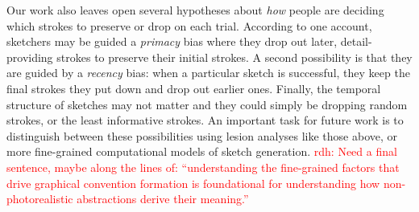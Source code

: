 \documentclass[10pt,letterpaper]{article}
\newcommand{\rdh}[1]{\textcolor{Red}{rdh: #1}}
\begin{document}
Our work also leaves open several hypotheses about \emph{how} people are deciding which strokes to preserve or drop on each trial.
According to one account, sketchers may be guided a \emph{primacy} bias where they drop out later, detail-providing strokes to preserve their initial strokes.
A second possibility is that they are guided by a \emph{recency} bias: when a particular sketch is successful, they keep the final strokes they put down and drop out earlier ones.
Finally, the temporal structure of sketches may not matter and they could simply be dropping random strokes, or the least informative strokes.
An important task for future work is to distinguish between these possibilities using lesion analyses like those above, or more fine-grained computational models of sketch generation.
\rdh{Need a final sentence, maybe along the lines of: ``understanding the fine-grained factors that drive graphical convention formation is foundational for understanding how non-photorealistic abstractions derive their meaning.''}



\setlength{\bibleftmargin}{.125in}
\setlength{\bibindent}{-\bibleftmargin}


\end{document}
